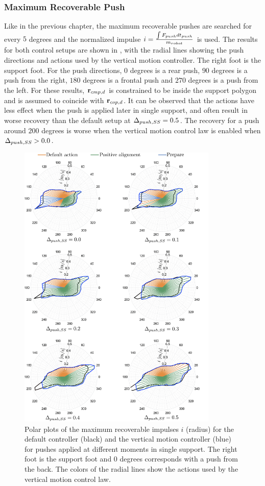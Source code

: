 \subsubsection{Maximum Recoverable Push}
Like in the previous chapter,  the maximum recoverable pushes are searched for every $5$ degrees and the normalized impulse $i = \frac{\int F_{push} dt_{push}}{m_{robot}}$ is used. The results for both control setups are shown in , with the radial lines showing the push directions and actions used by the vertical motion controller. The right foot is the support foot. For the push directions, $0$ degrees is a rear push, $90$ degrees is a push from the right, $180$ degrees is a frontal push and $270$ degrees is a push from the left. For these results, $\mathbf{r}_{cmp,d}$ is constrained to be inside the support polygon and is assumed to coincide with $\mathbf{r}_{cop,d}$. It can be observed that the actions have less effect when the push is applied later in single support, and often result in worse recovery than the default setup at $\Delta_{push,SS}=0.5$. The recovery for a push around $200$ degrees is worse when the vertical motion control law is enabled when $\Delta_{push,SS}>0.0$.
\begin{figure}
     \centering
        \includegraphics[width=0.85\textwidth]{STYLESTUFF/rounActions.png}
    \caption{Polar plots of the maximum recoverable impulses $i$ (radius) for the default controller (black) and the vertical motion controller (blue) for pushes applied at different moments in single support. The right foot is the support foot and $0$ degrees corresponds with a push from the back. The colors of the radial lines show the actions used by the vertical motion control law.}
    \label{fig:roundPushActions}
\end{figure}
